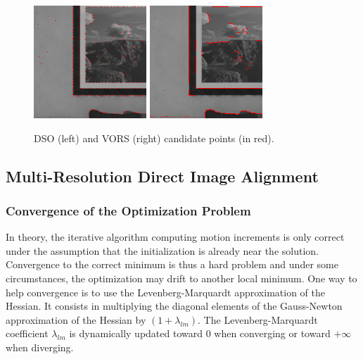 \begin{figure}[t]
	\centering
	\includegraphics[width=0.49\linewidth]{assets/img/candidates-icl-dso-cropped.png}
	\hfill
	\includegraphics[width=0.49\linewidth]{assets/img/candidates-icl-vors-cropped.png}
	\caption{DSO (left) and VORS (right) candidate points (in red).}%
	\label{fig:candidates-dso-vors}
\end{figure}

\subsection{Multi-Resolution Direct Image Alignment}%
\label{sub:multi-res-direct-image-alignment}

\subsubsection{Convergence of the Optimization Problem}%
\label{ssub:convergence-optimization}

In theory, the iterative algorithm computing motion increments is only correct under the assumption
that the initialization is already near the solution.
Convergence to the correct minimum is thus a hard problem
and under some circumstances, the optimization may drift to another local minimum.
One way to help convergence is to use the Levenberg-Marquardt approximation
of the Hessian.
It consists in multiplying the diagonal elements of
the Gauss-Newton approximation of the Hessian by $(1 + \lambda_{lm})$.
The Levenberg-Marquardt coefficient $\lambda_{lm}$ is dynamically
updated toward 0 when converging or toward $+\infty$ when diverging.

